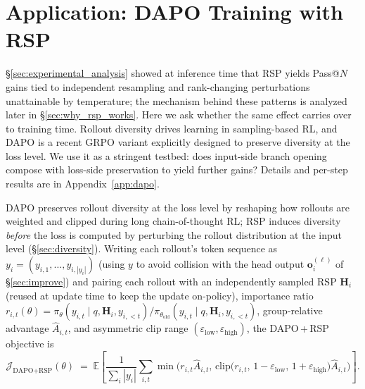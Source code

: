
\section{Application: DAPO Training with RSP}\label{sec:application}

\S\ref{sec:experimental_analysis} showed at inference time that RSP yields Pass@$N$ gains tied to independent resampling and rank-changing perturbations unattainable by temperature; the mechanism behind these patterns is analyzed later in \S\ref{sec:why_rsp_works}. Here we ask whether the same effect carries over to training time. Rollout diversity drives learning in sampling-based RL, and DAPO \citep{yu2025dapo} is a recent GRPO \citep{shao2024deepseekmath} variant explicitly designed to preserve diversity at the loss level. We use it as a stringent testbed: does input-side branch opening compose with loss-side preservation to yield further gains? Details and per-step results are in Appendix~\ref{app:dapo}.

DAPO preserves rollout diversity at the loss level by reshaping how rollouts are weighted and clipped during long chain-of-thought RL; RSP induces diversity \emph{before} the loss is computed by perturbing the rollout distribution at the input level (\S\ref{sec:diversity}). Writing each rollout's token sequence as $y_i = (y_{i,1},\dots,y_{i,|y_i|})$ (using $y$ to avoid collision with the head output $\mathbf{o}_i^{(\ell)}$ of \S\ref{sec:improve}) and pairing each rollout with an independently sampled RSP $\mathbf{H}_i$ (reused at update time to keep the update on-policy), importance ratio $r_{i,t}(\theta) = \pi_\theta(y_{i,t}\mid q, \mathbf{H}_i, y_{i,<t}) / \pi_{\theta_{\text{old}}}(y_{i,t}\mid q, \mathbf{H}_i, y_{i,<t})$, group-relative advantage $\hat{A}_{i,t}$, and asymmetric clip range $(\varepsilon_{\text{low}}, \varepsilon_{\text{high}})$, the DAPO\,+\,RSP objective is
\begin{equation}\label{eq:dapo_rsp}
\mathcal{J}_{\text{DAPO+RSP}}(\theta)
\;=\;
\mathbb{E}\!\left[
\frac{1}{\sum_i |y_i|}
\sum_{i,t}
\min\!\Big(r_{i,t}\hat{A}_{i,t},\,
\text{clip}\big(r_{i,t},\,1{-}\varepsilon_{\text{low}},\,1{+}\varepsilon_{\text{high}}\big)\hat{A}_{i,t}\Big)
\right].
\end{equation}

